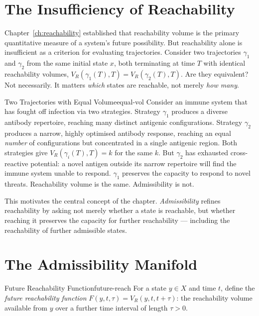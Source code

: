 \documentclass[12pt,twoside,openright]{book}
\newcommand{\bioicon}{\marginpar{\tiny\color{DistTeal}\faDna}}
\begin{document}
\section{The Insufficiency of Reachability}
\label{sec:ch14-insufficiency}

Chapter~\ref{ch:reachability} established that reachability
volume is the primary quantitative measure of a system's
future possibility. But reachability alone is insufficient
as a criterion for evaluating trajectories. Consider two
trajectories $\gamma_1$ and $\gamma_2$ from the same initial
state $x$, both terminating at time $T$ with identical
reachability volumes,
$V_R(\gamma_1(T),T) = V_R(\gamma_2(T),T)$. Are they
equivalent? Not necessarily. It matters \emph{which} states
are reachable, not merely \emph{how many}.

\begin{example}{Two Trajectories with Equal Volume}{equal-vol}
  \bioicon
  Consider an immune system that has fought off infection
  via two strategies. Strategy $\gamma_1$ produces a diverse
  antibody repertoire, reaching many distinct antigenic
  configurations. Strategy $\gamma_2$ produces a narrow,
  highly optimised antibody response, reaching an equal
  \emph{number} of configurations but concentrated in a
  single antigenic region. Both strategies give
  $V_R(\gamma_i(T),T)=k$ for the same $k$. But $\gamma_2$
  has exhausted cross-reactive potential: a novel antigen
  outside its narrow repertoire will find the immune system
  unable to respond. $\gamma_1$ preserves the capacity to
  respond to novel threats. Reachability volume is the
  same. Admissibility is not.
\end{example}

This motivates the central concept of the chapter.
\emph{Admissibility} refines reachability by asking not
merely whether a state is reachable, but whether reaching
it preserves the capacity for further reachability ---
including the reachability of further admissible states.

\section{The Admissibility Manifold}
\label{sec:ch14-manifold}

\begin{definition}{Future Reachability Function}{future-reach}
  For a state $y\in X$ and time $t$, define the
  \emph{future reachability function}
  $F(y,t,\tau) = V_R(y,t,t+\tau)$: the reachability volume
  available from $y$ over a further time interval of length
  $\tau > 0$.
\end{definition}
\end{document}
